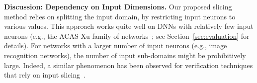 \documentclass[10pt, conference, twocolumn, compsocconf]{IEEEtran}
\theoremstyle{remark}
\begin{document}



\medskip
\noindent
\textbf{Discussion: Dependency on Input Dimensions.}
Our proposed slicing method relies on splitting the input domain, by
restricting input neurons to various values. This approach works quite
well on DNNs with relatively few input neurons (e.g., the ACAS Xu
family of networks~\cite{JuLoBrOwKo16}; see
Section~\ref{sec:evaluation} for details). For networks with a
larger number of input neurons (e.g., image recognition networks),
the number of input sub-domains might be prohibitively large. Indeed, a
similar phenomenon has been observed for verification techniques that
rely on input slicing~\cite{WaPeWhYaJa18,WuOzZeIrJuGoFoKaPaBa20}.
\end{document}
